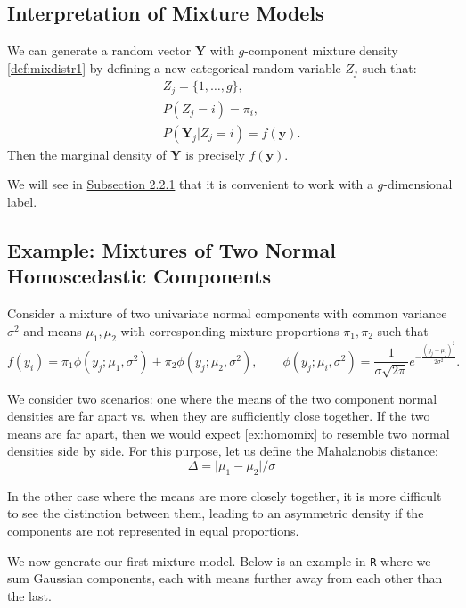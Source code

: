 \documentclass{article}\usepackage[]{graphicx}\usepackage[]{xcolor}
\theoremstyle{plain}
\theoremstyle{definition}
\theoremstyle{remark}
\newcommand{\boldY}{\mathbf{Y}}
\newcommand{\boldy}{\mathbf{y}}
\begin{document}
\subsection{Interpretation of Mixture Models}

We can generate a random vector $\boldY$ with $g$-component mixture density \eqref{def:mixdistr1} by defining a new categorical random variable $Z_j$ such that:
\begin{gather*}
    Z_j = \{1, \dots, g\}, \\
    P(Z_j = i) = \pi_i, \\
    P(\boldY_j \vert Z_j = i) = f(\boldy).
\end{gather*}
Then the marginal density of $\boldY$ is precisely $f(\boldy)$.

We will see in \hyperref[subsec:incomplete]{Subsection 2.2.1} that it is convenient to work with a $g$-dimensional label.

\subsection{Example: Mixtures of Two Normal Homoscedastic Components}

Consider a mixture of two univariate normal components with common variance $\sigma^2$ and means $\mu_1, \mu_2$ with corresponding mixture proportions $\pi_1, \pi_2$ such that
\begin{equation} \label{ex:homomix}
    f(y_i) = \pi_1 \phi(y_j; \mu_1, \sigma^2) + \pi_2 \phi(y_j; \mu_2, \sigma^2), \qquad \phi(y_j; \mu_i, \sigma^2) = \frac{1}{\sigma \sqrt{2 \pi}} e^{-\frac{(y_j - \mu_j)^2}{2 \sigma^2}}.
\end{equation}

We consider two scenarios: one where the means of the two component normal densities are far apart vs. when they are sufficiently close together. If the two means are far apart, then we would expect \eqref{ex:homomix} to resemble two normal densities side by side. For this purpose, let us define the Mahalanobis distance:
\nopagebreak
\begin{equation*}
    \Delta = \vert \mu_1 - \mu_2 \vert / \sigma
\end{equation*}

In the other case where the means are more closely together, it is more difficult to see the distinction between them, leading to an asymmetric density if the components are not represented in equal proportions.

We now generate our first mixture model. Below is an example in \texttt{R} where we sum Gaussian components, each with means further away from each other than the last.
\end{document}

